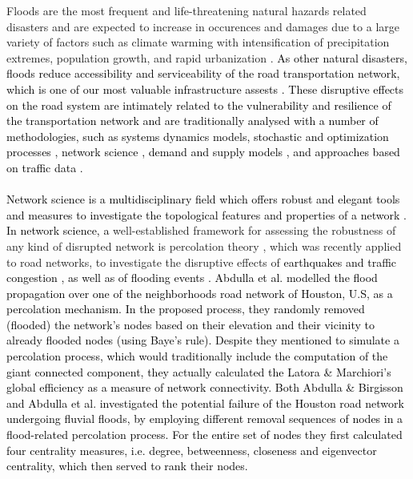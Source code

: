 \documentclass[twocolumn,fleqn,10pt]{wlscirep}
\begin{document}
Floods are the most frequent and life-threatening natural hazards related disasters \cite{AghaKouchak,Doocy,Kreibich,Wallemacq} and are expected to increase in occurences and damages due to a large variety of factors such as climate warming with intensification of precipitation extremes, population growth, and rapid urbanization \cite{Alfieri,Paprotny,SalmanAbdullahi,Tanoue,Ukkusuri2021,Visser,Wasko,Winsemius}. 
\textcolor{black}{As other natural disasters, floods reduce accessibility and serviceability of the road transportation network, which is one of our most}
\textcolor{black}{valuable infrastructure assests}
\textcolor{black}{\cite{Berdica2002}.}
\textcolor{black}{These}
\textcolor{black}{disruptive effects on the road system are intimately related to the vulnerability and resilience of the transportation network and are traditionally analysed with a number of methodologies, such as systems dynamics models, stochastic and optimization processes \cite{Goncalves2020}, network science \cite{Goncalves2020, Pan2021, Gajanayake2020,Mattsson2015}, demand and supply models \cite{Mattsson2015, Gajanayake2020}, and approaches based on traffic data \cite{Pan2021}.}
\\
\\
\textcolor{black}{
Network science is a multidisciplinary field \cite{Latora2017, Molontay2021, Newman2018,Vespignani2018} which offers robust and elegant tools and measures to investigate the topological features and properties of a network \cite{Albert2001,Newman2003}. In network science, a}
well-established framework for assessing the robustness of any kind of disrupted network is percolation theory \cite{Boccaletti2014,Gao2012b,Newman2018}, which was recently applied to road networks, to investigate the disruptive effects of
\textcolor{black}{
earthquakes \cite{Aydin2018a,Aydin2018b,Dong2019,Zhou2019b} and traffic congestion \cite{Hamedmoghadam2021,Li2015,Zeng2019,Zeng2020}, as well as of flooding events \cite{Abdulla2019_conference_paper,Abdulla2020_conference_paper,Abdulla2020_SIS,Abdulla2021,Fan2020,Farahmand2020,Dong2020a,Dong2020b,Ganin,Wang2019,Yadav}.
Abdulla et al. \cite{Abdulla2019_conference_paper} modelled the flood propagation over one of the neighborhoods road network of Houston, U.S, as a percolation mechanism. In the proposed process, they randomly removed (flooded) the network's nodes based on their elevation and their vicinity to already flooded nodes}
\textcolor{black}{(using Baye's rule).}
\textcolor{black}{Despite}
\textcolor{black}{they mentioned to simulate}
\textcolor{black}{
a percolation process, which would traditionally include the computation of the giant connected component, they actually calculated the Latora \& Marchiori's global efficiency \cite{Latora} as a measure of network connectivity.
Both Abdulla \& Birgisson \cite{Abdulla2020_conference_paper} and Abdulla et al. \cite{Abdulla2020_SIS} investigated the potential failure of the Houston road network undergoing fluvial floods, by employing different removal sequences of nodes in a flood-related percolation process. For the entire set of nodes they first calculated four centrality measures, i.e. degree, betweenness, closeness and eigenvector centrality, which then served to rank their nodes.} 
\end{document}
